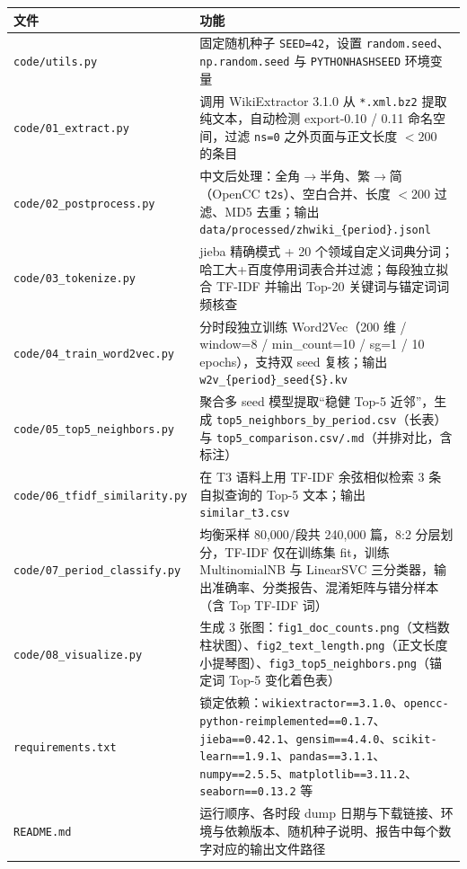 \documentclass[12pt,a4paper]{article}
\begin{document}
\begin{table}[H]
\centering
\renewcommand{\arraystretch}{1.25}
\begin{tabularx}{\textwidth}{|l|X|}
\hline
\textbf{文件} & \textbf{功能} \\
\hline
\texttt{code/utils.py} & 固定随机种子 \texttt{SEED=42}，设置 \texttt{random.seed}、\texttt{np.random.seed} 与 \texttt{PYTHONHASHSEED} 环境变量 \\
\hline
\texttt{code/01\_extract.py} & 调用 WikiExtractor 3.1.0 从 \texttt{*.xml.bz2} 提取纯文本，自动检测 export-0.10 / 0.11 命名空间，过滤 \texttt{ns=0} 之外页面与正文长度 $<200$ 的条目 \\
\hline
\texttt{code/02\_postprocess.py} & 中文后处理：全角$\rightarrow$半角、繁$\rightarrow$简（OpenCC \texttt{t2s}）、空白合并、长度 $<200$ 过滤、MD5 去重；输出 \texttt{data/processed/zhwiki\_\{period\}.jsonl} \\
\hline
\texttt{code/03\_tokenize.py} & jieba 精确模式 + 20 个领域自定义词典分词；哈工大+百度停用词表合并过滤；每段独立拟合 TF-IDF 并输出 Top-20 关键词与锚定词词频核查 \\
\hline
\texttt{code/04\_train\_word2vec.py} & 分时段独立训练 Word2Vec（200 维 / window=8 / min\_count=10 / sg=1 / 10 epochs），支持双 seed 复核；输出 \texttt{w2v\_\{period\}\_seed\{S\}.kv} \\
\hline
\texttt{code/05\_top5\_neighbors.py} & 聚合多 seed 模型提取“稳健 Top-5 近邻”，生成 \texttt{top5\_neighbors\_by\_period.csv}（长表）与 \texttt{top5\_comparison.csv/.md}（并排对比，含标注） \\
\hline
\texttt{code/06\_tfidf\_similarity.py} & 在 T3 语料上用 TF-IDF 余弦相似检索 3 条自拟查询的 Top-5 文本；输出 \texttt{similar\_t3.csv} \\
\hline
\texttt{code/07\_period\_classify.py} & 均衡采样 80,000/段共 240,000 篇，8:2 分层划分，TF-IDF 仅在训练集 fit，训练 MultinomialNB 与 LinearSVC 三分类器，输出准确率、分类报告、混淆矩阵与错分样本（含 Top TF-IDF 词） \\
\hline
\texttt{code/08\_visualize.py} & 生成 3 张图：\texttt{fig1\_doc\_counts.png}（文档数柱状图）、\texttt{fig2\_text\_length.png}（正文长度小提琴图）、\texttt{fig3\_top5\_neighbors.png}（锚定词 Top-5 变化着色表） \\
\hline
\texttt{requirements.txt} & 锁定依赖：\texttt{wikiextractor==3.1.0}、\texttt{opencc-python-reimplemented==0.1.7}、\texttt{jieba==0.42.1}、\texttt{gensim==4.4.0}、\texttt{scikit-learn==1.9.1}、\texttt{pandas==3.1.1}、\texttt{numpy==2.5.5}、\texttt{matplotlib==3.11.2}、\texttt{seaborn==0.13.2} 等 \\
\hline
\texttt{README.md} & 运行顺序、各时段 dump 日期与下载链接、环境与依赖版本、随机种子说明、报告中每个数字对应的输出文件路径 \\
\hline
\end{tabularx}
\end{table}
\end{document}
